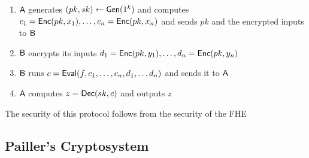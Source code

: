 \begin{itemize}
    \begin{enumerate}
        \item $\mathsf{A}$ generates $(pk, sk) \leftarrow \mathsf{Gen}(1^k)$ and computes $c_1 = \mathsf{Enc}(pk, x_1), \dots, c_n = \mathsf{Enc}(pk, x_n)$ and sends $pk$ and the encrypted inputs to $\mathsf{B}$
        \item $\mathsf{B}$ encrypts its inputs $d_1 = \mathsf{Enc}(pk, y_1), \dots, d_n = \mathsf{Enc}(pk , y_n)$
        \item $\mathsf{B}$ runs $c =\mathsf{Eval}(f, c_1, \dots, c_n, d_1, \dots d_n)$ and sends it to $\mathsf{A}$
        \item $\mathsf{A}$ computes $z = \mathsf{Dec}(sk, c)$ and outputs $z$ 
    \end{enumerate}
    The security of this protocol follows from the security of the FHE
\end{itemize}

\subsection{Pailler's Cryptosystem}%
